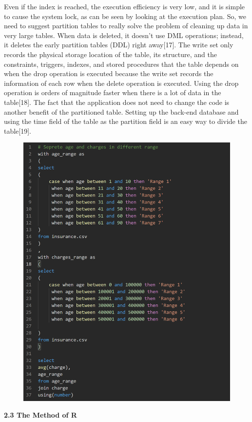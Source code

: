 \documentclass[journal]{IEEEtran}
\begin{document}
Even if the index is reached, the execution efficiency is very low, and it is simple to cause the system lock, as can be seen by looking at the execution plan. So, we need to suggest partition tables to really solve the problem of cleaning up data in very large tables. When data is deleted, it doesn't use DML operations; instead, it deletes the early partition tables (DDL) right away[17].
The write set only records the physical storage location of the table, its structure, and the constraints, triggers, indexes, and stored procedures that the table depends on when the drop operation is executed because the write set records the information of each row when the delete operation is executed. Using the drop operation is orders of magnitude faster when there is a lot of data in the table[18].
The fact that the application does not need to change the code is another benefit of the partitioned table. Setting up the back-end database and using the time field of the table as the partition field is an easy way to divide the table[19].

\begin{figure}[h]
  \centering
  \includegraphics [width= 3.55 in]{12.png}
\caption{}
  \label{storage}
\end{figure}


 
\textbf{2.3 The Method of R}
\end{document}
